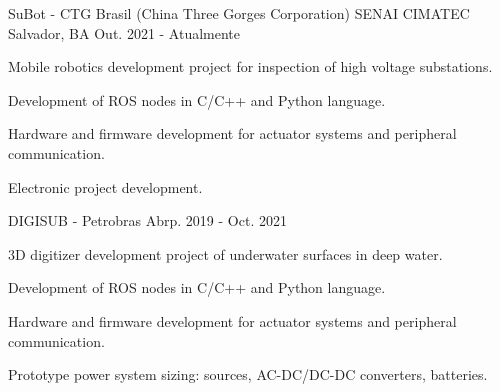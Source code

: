 

\begin{cventries}

  \cventry
    {SuBot - CTG Brasil (China Three Gorges Corporation)} %
    {SENAI CIMATEC} %
    {Salvador, BA} %
    {Out. 2021 - Atualmente} %
    {
      \begin{cvitems} %
        \item {Mobile robotics development project for inspection of high voltage substations.}
        \item {Development of ROS nodes in C/C++ and Python language.}
        \item {Hardware and firmware development for actuator systems and peripheral communication.}
        \item {Electronic project development.}
      \end{cvitems}
    }


  \cventry
    {DIGISUB - Petrobras} %
    {} %
    {} %
    {Abrp. 2019 - Oct. 2021} %
    {
      \begin{cvitems} %
        \item {3D digitizer development project of underwater surfaces in deep water.}
        \item {Development of ROS nodes in C/C++ and Python language.}
        \item {Hardware and firmware development for actuator systems and peripheral communication.}
        \item {Prototype power system sizing: sources, AC-DC/DC-DC converters, batteries.}
      \end{cvitems}
    }



\end{cventries}
